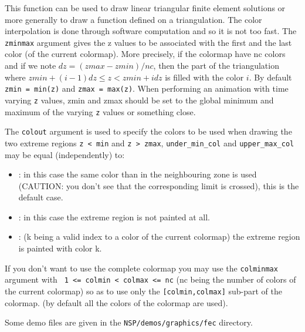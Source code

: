\begin{mandescription}
  This function can be used to draw linear triangular finite element solutions
  or more generally to draw a function defined on a triangulation. The color interpolation
  is done through software computation and so it is not too fast.
  The \verb!zminmax! argument gives the z values to be associated with the first and the last
  color (of the current colormap). More precisely, if the colormap have nc colors and if we note
  $dz = (zmax-zmin)/nc$, then the part of the triangulation where
  $zmin + (i-1)dz \le z < zmin + i dz$ is filled with the color $i$.
  By default \verb!zmin = min(z)! and \verb!zmax = max(z)!. When performing
  an animation with time varying \verb!z! values, zmin and zmax should be set to
  the global minimum and maximum of the varying \verb!z! values or something close.

  The \verb!colout! argument is used to specify the colors to be used when drawing the
  two extreme regions \verb!z < min! and \verb!z > zmax!, \verb!under_min_col! and
  \verb!upper_max_col! may be equal (independently) to:
  \begin{itemize}
  \item {} : in this case the same color than in the neighbouring zone is used (CAUTION:
    you don't see that the corresponding limit is crossed), this is the default case.
  \item {} : in this case the extreme region is not painted at all.
  \item {} : (k being a valid index to a color of the current colormap) the extreme region
    is painted with color k.
  \end{itemize}
  If you don't want to use the complete colormap you may use the \verb!colminmax!
  argument with \verb! 1 <= colmin < colmax <= nc! (nc being the number of colors
  of the current colormap) so as to use only the \verb![colmin,colmax]!  sub-part of the colormap.
  (by default all the colors of the colormap are used).

  Some demo files are given in the \verb!NSP/demos/graphics/fec! directory.
\end{mandescription}

